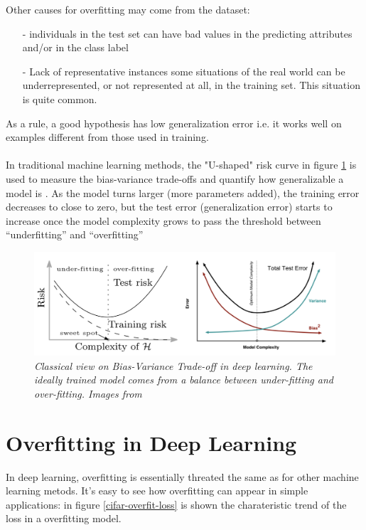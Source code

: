 \documentclass[11pt,a4paper]{article}
\begin{document}
Other causes for overfitting may come from the dataset: 

\begin{itemize}
 \item [-] individuals in the test set can have bad values in the predicting attributes
           and/or in the class label
 \item [-] Lack of representative instances some situations of the real world can be underrepresented, or not represented at all, in the training set. This situation is quite common.
\end{itemize}

As a rule, a good hypothesis has low generalization error i.e. it works well on examples different from those used in training.
\\
\\
In traditional machine learning methods, the "U-shaped" risk curve in figure \ref{bias-variance-tradeoff} is used to measure the bias-variance trade-offs and quantify how generalizable a model is \cite{weng2019overfit}.
As the model turns larger (more parameters added), the training error decreases to close to zero, but the test error (generalization error) starts to increase once the model complexity grows to pass the threshold between “underfitting” and “overfitting”

\begin{figure}[H]
 \centering
 \includegraphics[scale=0.3]{../images/bias-variance-risk-curve.png}
 \caption{\textit{Classical view on Bias-Variance Trade-off in deep learning. The ideally trained model comes from a balance between under-fitting and over-fitting. Images from \cite{doubleU}}}  
 \label{bias-variance-tradeoff}
\end{figure}

\section*{Overfitting in Deep Learning}

In deep learning, overfitting is essentially threated the same as for other machine learning metods. 
It's easy to see how overfitting can appear in simple applications: in figure \ref{cifar-overfit-loss} is shown the charateristic trend of the loss in a overfitting model. 
\end{document}
